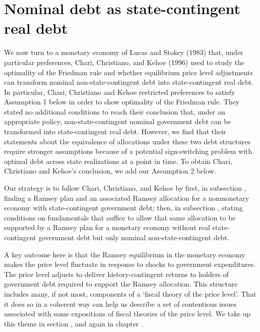 \section{Nominal debt  as
state-contingent real debt}\label{sec:nom_into_real}%
We now turn to a monetary economy of Lucas and Stokey (1983) that, under particular preferences,
Chari, Christiano, and Kehoe (1996)  used to study the optimality of the
Friedman rule and whether  equilibrium price level adjustments can transform nominal
non-state-contingent debt into state-contingent real debt.
In particular,  Chari, Christiano and Kehoe restricted preferences to satisfy  Assumption 1 below in order to  show optimality of the Friedman rule.
They stated no additional conditions to reach their conclusion that, under an appropriate policy,  non-state-contingent nominal government debt can be transformed into
   state-contingent real debt.  However, we find that their statements about the equivalence of allocations under these two debt structures  require stronger assumptions  because of a potential  sign-switching problem with  optimal debt across state realizations at a point in time. To obtain Chari, Christiano and Kehoe's conclusion,  we add our  Assumption 2 below. %
%
%

Our strategy is to follow Chari, Christiano, and Kehoe by first, in subsection ,  finding a Ramsey plan and an associated Ramsey allocation for a nonmonetary
economy with state-contingent government debt; then, in subsection ,  stating  conditions on fundamentals that suffice to allow that  same allocation to  be supported by a Ramsey plan for
a monetary economy without real state-contingent government debt but only nominal non-state-contingent debt.

A key outcome here is that the Ramsey equilibrium in the monetary economy makes
the price level fluctuate in response to  shocks to government expenditures. The price level adjusts  to deliver history-contingent returns to
holders of government debt required to support the Ramsey allocation.      %
This structure includes many, if not most, components of  a `fiscal theory of the price level'. That it does so in a coherent way  can help us describe a set of contentious
  issues associated with some expositions of fiscal  theories of the price level.   We take up this theme in section , and again in
chapter .
%

